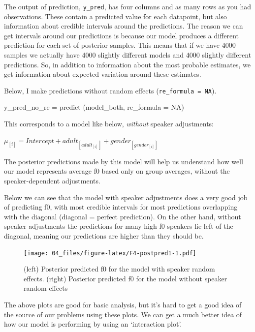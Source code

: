 \documentclass[
]{book}
\newenvironment{Shaded}{\begin{snugshade}}{\end{snugshade}}
\newcommand{\AttributeTok}[1]{\textcolor[rgb]{0.77,0.63,0.00}{#1}}
\newcommand{\ConstantTok}[1]{\textcolor[rgb]{0.00,0.00,0.00}{#1}}
\newcommand{\FunctionTok}[1]{\textcolor[rgb]{0.00,0.00,0.00}{#1}}
\newcommand{\NormalTok}[1]{#1}
\newcommand{\OtherTok}[1]{\textcolor[rgb]{0.56,0.35,0.01}{#1}}
\begin{document}
The output of prediction, \texttt{y\_pred}, has four columns and as many rows as you had observations. These contain a predicted value for each datapoint, but also information about credible intervals around the predictions. The reason we can get intervals around our predictions is because our model produces a different prediction for each set of posterior samples. This means that if we have 4000 samples we actually have 4000 slightly different models and 4000 slightly different predictions. So, in addition to information about the most probable estimates, we get information about expected variation around these estimates.

Below, I make predictions without random effects (\texttt{re\_formula\ =\ NA}).

\begin{Shaded}
\begin{Highlighting}[]
\NormalTok{y\_pred\_no\_re }\OtherTok{=} \FunctionTok{predict}\NormalTok{ (model\_both, }\AttributeTok{re\_formula =} \ConstantTok{NA}\NormalTok{)}
\end{Highlighting}
\end{Shaded}

This corresponds to a model like below, \emph{without} speaker adjustments:

\(\mu_{[i]} = Intercept + adult_{[adult_{[i]}]} + gender_{[gender_{[i]}]}\)

The posterior predictions made by this model will help us understand how well our model represents average f0 based only on group averages, without the speaker-dependent adjustments.

Below we can see that the model with speaker adjustments does a very good job of predicting f0, with most credible intervals for most predictions overlapping with the diagonal (diagonal = perfect prediction). On the other hand, without speaker adjustments the predictions for many high-f0 speakers lie left of the diagonal, meaning our predictions are higher than they should be.

\begin{figure}
\centering
\texttt{[image: 04\_files/figure-latex/F4-postpred1-1.pdf]}
\caption{\label{fig:F4-postpred1}(left) Posterior predicted f0 for the model with speaker random effects. (right) Posterior predicted f0 for the model without speaker random effects}
\end{figure}

The above plots are good for basic analysis, but it's hard to get a good idea of the source of our problems using these plots. We can get a much better idea of how our model is performing by using an `interaction plot'.
\end{document}
